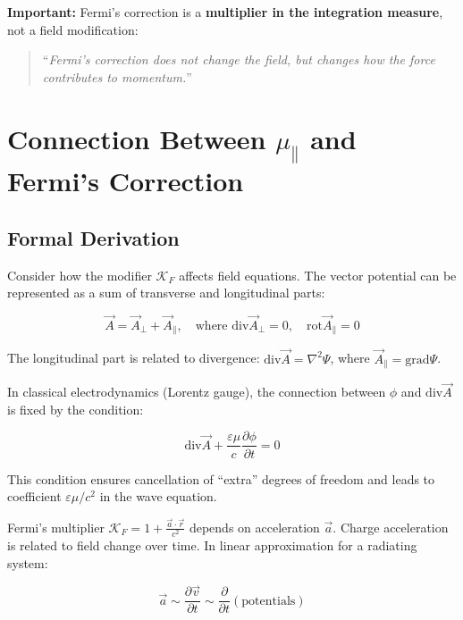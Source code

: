 \documentclass[12pt, a4paper]{article}
\begin{document}
\textbf{Important:} Fermi's correction is a \textbf{multiplier in the integration measure}, not a field modification:

\begin{quote}
``\textit{Fermi's correction does not change the field, but changes how the force contributes to momentum.}'' \cite{FermiSolution}
\end{quote}

\section{Connection Between $\mu_{\parallel}$ and Fermi's Correction}

\subsection{Formal Derivation}

Consider how the modifier $\mathcal{K}_F$ affects field equations. The vector potential can be represented as a sum of transverse and longitudinal parts:

\begin{equation}
\vec{A} = \vec{A}_{\perp} + \vec{A}_{\parallel}, \quad \text{where } \text{div} \vec{A}_{\perp} = 0, \quad \text{rot} \vec{A}_{\parallel} = 0
\label{eq:potential_decomposition}
\end{equation}

The longitudinal part is related to divergence: $\text{div} \vec{A} = \nabla^2 \Psi$, where $\vec{A}_{\parallel} = \text{grad} \Psi$.

In classical electrodynamics (Lorentz gauge), the connection between $\phi$ and $\text{div} \vec{A}$ is fixed by the condition:

\begin{equation}
\text{div} \vec{A} + \frac{\varepsilon \mu}{c} \frac{\partial \phi}{\partial t} = 0
\label{eq:lorentz_condition}
\end{equation}

This condition ensures cancellation of ``extra'' degrees of freedom and leads to coefficient $\varepsilon \mu / c^2$ in the wave equation.

Fermi's multiplier $\mathcal{K}_F = 1 + \frac{\vec{a} \cdot \vec{r}}{c^2}$ depends on acceleration $\vec{a}$. Charge acceleration is related to field change over time. In linear approximation for a radiating system:

\begin{equation}
\vec{a} \sim \frac{\partial \vec{v}}{\partial t} \sim \frac{\partial}{\partial t} (\text{potentials})
\label{eq:acceleration_potentials}
\end{equation}
\end{document}
